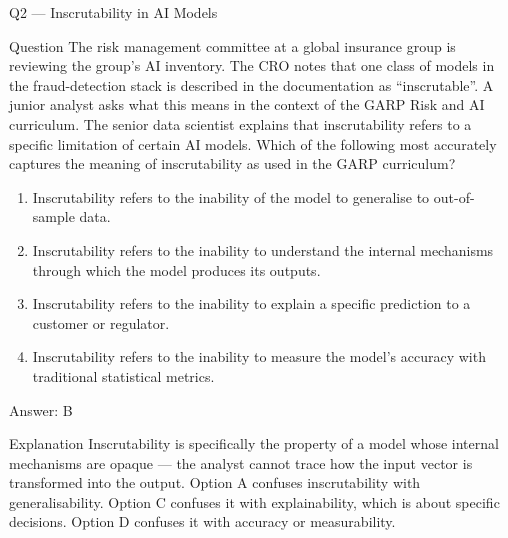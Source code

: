 \documentclass[aspectratio=169,8pt]{beamer}
\begin{document}
	\begin{frame}{Q2 --- Inscrutability in AI Models}
		\begin{block}{Question}
			The risk management committee at a global insurance group is reviewing the group's AI inventory. The CRO notes that one class of models in the fraud-detection stack is described in the documentation as ``inscrutable''. A junior analyst asks what this means in the context of the GARP Risk and AI curriculum. The senior data scientist explains that inscrutability refers to a specific limitation of certain AI models. Which of the following most accurately captures the meaning of inscrutability as used in the GARP curriculum?
		\end{block}
		\begin{enumerate}
			\item Inscrutability refers to the inability of the model to generalise to out-of-sample data.
			\item Inscrutability refers to the inability to understand the internal mechanisms through which the model produces its outputs.
			\item Inscrutability refers to the inability to explain a specific prediction to a customer or regulator.
			\item Inscrutability refers to the inability to measure the model's accuracy with traditional statistical metrics.
		\end{enumerate}
		\begin{exampleblock}{Answer: B}\end{exampleblock}
		\begin{block}{Explanation}
			Inscrutability is specifically the property of a model whose internal mechanisms are opaque --- the analyst cannot trace how the input vector is transformed into the output. Option A confuses inscrutability with generalisability. Option C confuses it with explainability, which is about specific decisions. Option D confuses it with accuracy or measurability.
		\end{block}
	\end{frame}
	
\end{document}
